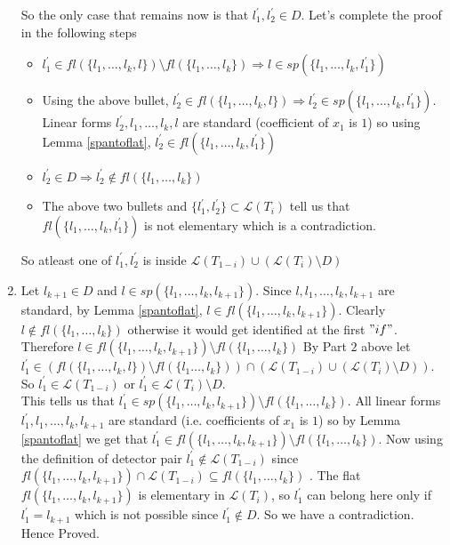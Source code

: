 \documentclass[letterpaper,USenglish,numberwithinsect]{lipics}
\newcommand{\ML}{\mathcal{L}}
\begin{document}
\begin{enumerate}
So the only case that remains
now is that $l_1^\prime,l_2^\prime \in D$.  Let's complete the proof in the following steps
\begin{itemize}
 \item $l_1^\prime\in fl(\{l_{1},\ldots,l_{k},l\})\setminus fl(\{l_{1},\ldots,l_{k}\})
\Rightarrow l\in sp(\{l_{1},\ldots,l_{k},l_1^\prime\})$
\item Using the above bullet, $l_2^\prime \in fl(\{l_1,\ldots,l_k,l\})\Rightarrow l_2^\prime \in sp(\{l_{1},\ldots,l_{k},l_1^\prime\})$. Linear forms
$l_2^\prime, l_1,\ldots,l_k,l$ are standard (coefficient of $x_1$ is $1$) so using Lemma \ref{spantoflat}, $l_2^\prime \in fl(\{l_{1},\ldots,l_{k},l_1^\prime\})$
\item $l_2^\prime\in D \Rightarrow l_2^\prime\notin fl(\{l_{1},\ldots,l_{k}\})$
\item The above two bullets and $\{l_1^\prime,l_2^\prime\}\subset \ML(T_i)$ tell us that $fl(\{l_1,\ldots,l_k,l_1^\prime\})$
is not elementary which is a contradiction.
\end{itemize}
So atleast one of $l_1^\prime,l_2^\prime$ is inside $\ML(T_{1-i})\cup (\ML(T_i)\setminus D)$


\item Let $l_{k+1}\in D$ and $l\in sp(\{l_{1},\ldots,l_{k},l_{k+1}\})$. Since $l,l_1,\ldots,l_k,l_{k+1}$ are standard, by Lemma
\ref{spantoflat},
$l\in fl(\{l_{1},\ldots,l_{k},l_{k+1}\})$. Clearly $l\notin fl(\{l_{1},\ldots,l_{k}\})$ otherwise it would get identified at
the first $"if"$. Therefore $l\in fl(\{l_1,\ldots,l_k,l_{k+1}\})\setminus fl(\{l_1,\ldots,l_k\})$
By Part $2$ above let $l_1^\prime
\in (fl(\{l_{1},\ldots,l_{k},l\})\setminus fl(\{l_{1}\ldots,l_{k}\})) \cap (\ML(T_{1-i})\cup
(\ML(T_i)\setminus D))$. So $l_1^\prime \in \ML(T_{1-i})$ or $l_1^\prime \in \ML(T_i)\setminus D$.\\

This tells us that $l_1^\prime \in sp(\{l_{1},\ldots,l_{k},l_{k+1}\})\setminus fl(\{l_{1},\ldots,l_{k}\})$.
All linear forms $l_1^\prime,l_1,\ldots,l_k,l_{k+1}$ are standard (i.e. coefficients of $x_1$ is $1$) so by Lemma \ref{spantoflat}
we get that $l_1^\prime \in fl(\{l_{1},\ldots,l_{k},l_{k+1}\})\setminus fl(\{l_{1},\ldots,l_{k}\})$. Now using
the definition of detector pair $l_1^\prime \notin \ML(T_{1-i})$ since $fl(\{l_{1},\ldots,l_{k},l_{k+1}\})\cap \ML(T_{1-i})
\subseteq fl(\{l_{1},\ldots,l_{k}\})$ . The flat $fl(\{l_1,\ldots,l_k,l_{k+1}\})$ is elementary
in $\ML(T_i)$, so $l_1^\prime$ can belong here only if $l_1^\prime=l_{k+1}$ which is not possible since $l_1^\prime \notin D$.
So we have a contradiction. Hence Proved.

\end{enumerate}
\end{document}
